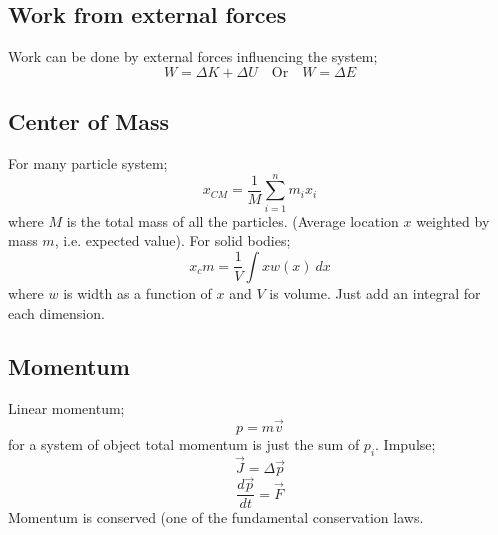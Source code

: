 \documentclass{article}
\begin{document}
\begin{multicols}{2}
\subsection*{Work from external forces}
Work can be done by external forces influencing the system;
\[
	W = \Delta K + \Delta U \quad \text{Or} \quad W = \Delta E
\]

\subsection*{Center of Mass}
For many particle system;
\[
	x_{CM} = \frac{1}{M}\sum_{i=1}^n m_i x_i
\]
where $M$ is the total mass of all the particles. (Average location $x$ weighted by mass $m$, i.e. expected value).
For solid bodies;
\[
	x_cm = \frac{1}{V} \int x w(x) \ dx
\]
where $w$ is width as a function of $x$ and $V$ is volume. Just add an integral for each dimension.

\subsection*{Momentum}
Linear momentum;
\[
	p = m \vec{v}
\]
for a system of object total momentum is just the sum of $p_i$.
Impulse;
\[
	\vec{J} = \Delta \vec{p}
\]
\[
	\frac{d\vec{p}}{dt} = \vec{F}
\]
Momentum is conserved (one of the fundamental conservation laws.

\end{multicols}

\pagebreak
\end{document}
